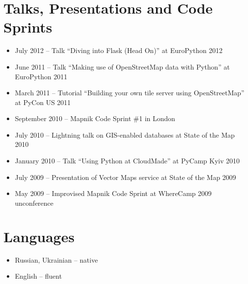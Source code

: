 \documentclass[margin]{res}
\begin{document}
\begin{resume}
\section{Talks, Presentations and Code Sprints}

\begin{itemize}
\item July 2012 -- Talk ``Diving into Flask (Head On)'' at EuroPython 2012
\item June 2011 -- Talk ``Making use of OpenStreetMap data with Python'' at EuroPython 2011
\item March 2011 -- Tutorial ``Building your own tile server using OpenStreetMap'' at PyCon US 2011
\item September 2010 -- Mapnik Code Sprint \#1 in London
\item July 2010 -- Lightning talk on GIS-enabled databases at State of the Map 2010
\item January 2010 -- Talk ``Using Python at CloudMade'' at PyCamp Kyiv 2010
\item July 2009 -- Presentation of Vector Maps service at State of the Map 2009
\item May 2009 -- Improvised Mapnik Code Sprint at WhereCamp 2009 unconference
\end{itemize}

\section{Languages}
\begin{itemize} \itemsep -1pt
\item Russian, Ukrainian -- native
\item English -- fluent
\end{itemize}

\end{resume}
\end{document}
